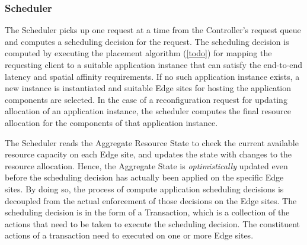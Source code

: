 \subsubsection{Scheduler}
\label{sec:scheduler}
The Scheduler picks up one request at a time from the Controller's request queue and computes a scheduling decision for the request. The scheduling decision is computed by executing the placement algorithm (\cref{todo}) for mapping the requesting client to a suitable application instance that can satisfy the end-to-end latency and spatial affinity requirements. If no such application instance exists, a new instance is instantiated and suitable Edge sites for hosting the application components are selected. In the case of a reconfiguration request for updating allocation of an application instance, the scheduler computes the final resource allocation for the components of that application instance.
\par The Scheduler reads the Aggregate Resource State to check the current available resource capacity on each Edge site, and updates the state with changes to the resource allocation. Hence, the Aggregate State is \textit{optimistically} updated even before the scheduling decision has actually been applied on the specific Edge sites. By doing so, the process of compute application scheduling decisions is decoupled from the actual enforcement of those decisions on the Edge sites. The scheduling decision is in the form of a Transaction, which is a collection of the actions that need to be taken to execute the scheduling decision. The constituent actions of a transaction need to executed on one or more Edge sites. 

